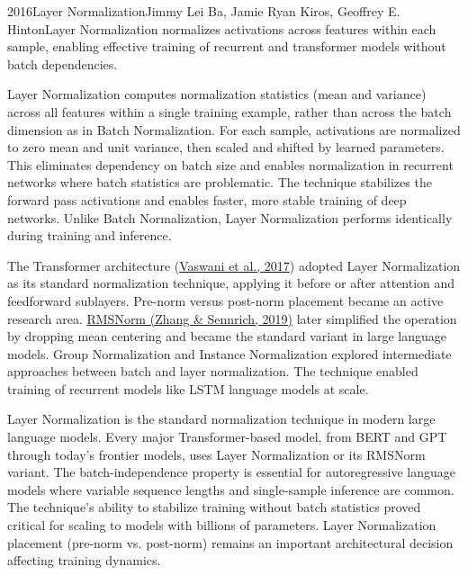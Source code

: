
\begin{papersummary}{2016}{Layer Normalization}{Jimmy Lei Ba, Jamie Ryan Kiros, Geoffrey E. Hinton}{Layer Normalization normalizes activations across features within each sample, enabling effective training of recurrent and transformer models without batch dependencies.}

Layer Normalization computes normalization statistics (mean and variance) across all features within a single training example, rather than across the batch dimension as in Batch Normalization. For each sample, activations are normalized to zero mean and unit variance, then scaled and shifted by learned parameters. This eliminates dependency on batch size and enables normalization in recurrent networks where batch statistics are problematic. The technique stabilizes the forward pass activations and enables faster, more stable training of deep networks. Unlike Batch Normalization, Layer Normalization performs identically during training and inference.

The Transformer architecture (\hyperref[paper:vaswani-2017]{Vaswani et al., 2017}) adopted Layer Normalization as its standard normalization technique, applying it before or after attention and feedforward sublayers. Pre-norm versus post-norm placement became an active research area. \hyperref[paper:zhang-2019-rmsnorm]{RMSNorm (Zhang \& Sennrich, 2019)} later simplified the operation by dropping mean centering and became the standard variant in large language models. Group Normalization and Instance Normalization explored intermediate approaches between batch and layer normalization. The technique enabled training of recurrent models like LSTM language models at scale.

Layer Normalization is the standard normalization technique in modern large language models. Every major Transformer-based model, from BERT and GPT through today's frontier models, uses Layer Normalization or its RMSNorm variant. The batch-independence property is essential for autoregressive language models where variable sequence lengths and single-sample inference are common. The technique's ability to stabilize training without batch statistics proved critical for scaling to models with billions of parameters. Layer Normalization placement (pre-norm vs. post-norm) remains an important architectural decision affecting training dynamics.

\end{papersummary}

